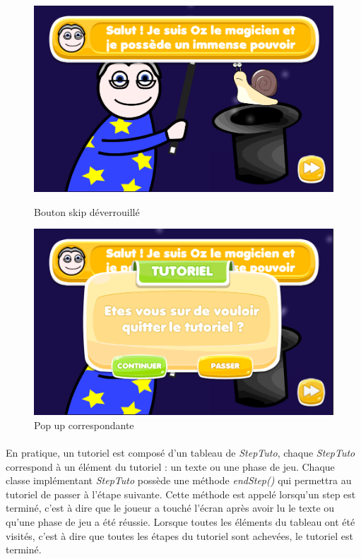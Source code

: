\begin{figure}[H]
 \begin{minipage}{0.49\textwidth}\centering
     \includegraphics[scale=0.2]{./img/skip_unlocked.png}
     \caption{Bouton skip déverrouillé}
     \label{skip_unlocked}
   \end{minipage}
   \begin {minipage}{0.49\textwidth}\centering
     \includegraphics[scale=0.2]{./img/skip_unlocked_popup.png}
     \caption{Pop up correspondante}
     \label{skip_unlocked_popup}
   \end{minipage}
\end{figure}

\paragraph{}
En pratique, un tutoriel est composé d'un tableau de \textit{StepTuto}, chaque \textit{StepTuto} correspond à un élément du tutoriel : un texte ou une phase de jeu. Chaque classe implémentant \textit{StepTuto} possède une méthode \textit{endStep()} qui permettra au tutoriel de passer à l'étape suivante. Cette méthode est appelé lorsqu'un step est terminé, c'est à dire que le joueur a touché l'écran après avoir lu le texte ou qu'une phase de jeu a été réussie. Lorsque toutes les éléments du tableau ont été visités, c'est à dire que toutes les étapes du tutoriel sont achevées, le tutoriel est terminé.


